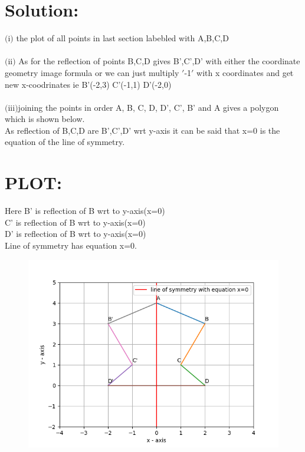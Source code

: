 \documentclass[11pt, letterpaper]{article}
\begin{document}
\section{Solution:}
\begin{LARGE}
$($i$)$ the plot of all points in last section labebled with  A,B,C,D\\\\
$($ii$)$ As for the reflection of points B,C,D
 gives B',C',D' with either the coordinate geometry image formula or we can just  multiply $'$-1$'$ with x coordinates and get new x-coodrinates ie B'(-2,3) C'(-1,1) D'(-2,0)\\\\
 
 $($iii$)$joining the points in order  A, B, C, D, D', C', B' and A gives a polygon which is shown below.\\
    As reflection of B,C,D are B',C',D' wrt y-axis it can be said that x=0 is the equation of the line of symmetry.
 \pagebreak
  \section{PLOT:}
  Here 
  B' is reflection of B wrt to y-axis(x=0)\\
  C' is reflection of B wrt to y-axis(x=0)\\
  D' is reflection of B wrt to y-axis(x=0)\\
  Line of symmetry has equation x=0.
 \begin{figure}[h]
 	\centering
 	\includegraphics[scale=1.0]{./Figs/Figure_1.png}
 \end{figure}
 \end{LARGE}
\end{document}
